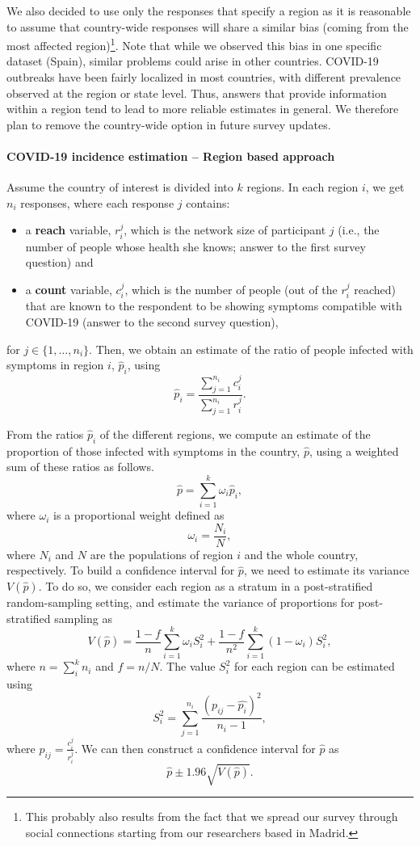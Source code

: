 \documentclass{article}
\begin{document}
We also decided to use only the responses that specify a region as it is reasonable to assume that country-wide responses will share a similar bias (coming from the most affected region)\footnote{This probably also results from the fact that we spread our survey through social connections starting from our researchers based in Madrid.}. Note that while we observed this bias in one specific dataset (Spain), similar problems could arise in other countries. COVID-19 outbreaks have been fairly localized in most countries, with different prevalence observed at the region or state level. Thus, answers that provide information within a region tend to lead to more reliable estimates in general. We therefore plan to remove the country-wide option in future survey updates.

\paragraph{COVID-19 incidence estimation -- Region based approach}
Assume the country of interest is divided into $k$ regions. In each region $i$, we get $n_i$ responses, where each response $j$ contains:
\begin{itemize}
    \item a \textbf{reach} variable, $r_i^j$, which is the network size of participant $j$ (i.e., the number of people whose health she knows; answer to the first survey question) and
    \item a \textbf{count} variable, $c_i^j$, which is the number of people (out of the $r_i^j$ reached) that are known to the respondent to be showing symptoms compatible with COVID-19 (answer to the second survey question),
\end{itemize}
for $j \in \{1,\ldots,n_i\}$. Then, we obtain an estimate of the ratio of people infected with symptoms in region $i$, $\hat{p}_i$, using \cite{bernard2010counting}
$$
\hat{p}_i = \frac{\sum_{j = 1}^{n_i} c_i^j}{\sum_{j = 1}^{n_i} r_i^j}.
$$ 

From the ratios $\hat{p}_i$ of the different regions, we compute an estimate of the proportion of those infected with symptoms in the country, $\hat{p}$, using a weighted sum of these ratios as follows.
$$
\hat{p} = \sum_{i=1}^k \omega_i \hat{p}_i,
$$
where $\omega_i$ is a proportional weight defined as 
$$
\omega_i = \frac{N_i}{N},
$$ 
where $N_i$ and $N$ are the populations of region $i$ and the whole country, respectively.  To build a confidence interval for $\hat{p}$, we need to estimate its variance  $V\left( \hat{p} \right)$. To do so, we consider each region as a stratum in a post-stratified random-sampling setting, and estimate the variance of proportions for post-stratified sampling \cite{Holt1979} as 
$$
V\left( \hat{p} \right) = \frac{1-f}{n} \sum_{i=1}^k \omega_iS_i^2 + \frac{1-f}{n^2} \sum_{i=1}^k (1-\omega_i)S_i^2,$$ 
where $n = \sum_i^k n_i$ and $f = n/N$. The value $S_i^2$ for each region can be estimated using
$$S_i^2= \sum_{j=1}^{n_i} \frac{(p_{ij}-\hat{p_i})^2 }{n_i-1},$$
where $p_{ij} =  \frac{c_{i}^j}{r_i^j}$. We can then construct a confidence interval for $\hat{p}$ as
$$\hat{p} \pm 1.96 \sqrt{V(\hat{p})}.$$
\end{document}
